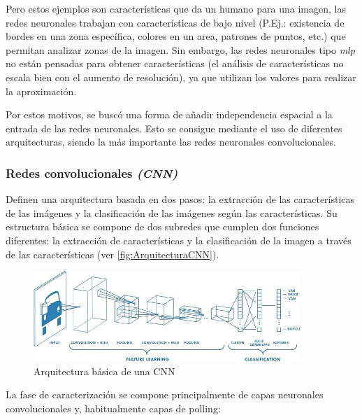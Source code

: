 Pero estos ejemplos son características que da un humano para una imagen, las redes neuronales trabajan con características de bajo nivel (P.Ej.: existencia de bordes en una zona específica, colores en un area, 
patrones de puntos, etc.) que permitan analizar zonas de la imagen. Sin embargo, las redes neuronales tipo \textit{\acrshort{mlp}} no están pensadas para obtener características (el análisis de características 
no escala bien con el aumento de resolución), ya que utilizan los valores para realizar la aproximación.

Por estos motivos, se buscó una forma de añadir independencia espacial a la entrada de las redes neuronales. Esto se consigue mediante el uso de diferentes arquitecturas, siendo la más importante las redes 
neuronales convolucionales.\newline

\subsubsection{Redes convolucionales \textit{(CNN)}}

Definen una arquitectura basada en dos pasos: la extracción de las características de las imágenes y la clasificación de las imágenes según las características. Su estructura básica se compone de dos subredes 
que cumplen dos funciones diferentes: la extracción de características y la clasificación de la imagen a través de las características (ver \autoref{fig:ArquitecturaCNN}).

\begin{figure}[H]
    \centering
    \includegraphics[width=0.9\textwidth]{images/4/ArquitecturaCNN.png}
    \caption{Arquitectura básica de una CNN\cite{sahaComprehensiveGuideConvolutional2022}}
    \label{fig:ArquitecturaCNN}
\end{figure}

\clearpage

La fase de caracterización se compone principalmente de capas neuronales convolucionales y, habitualmente capas de polling:

